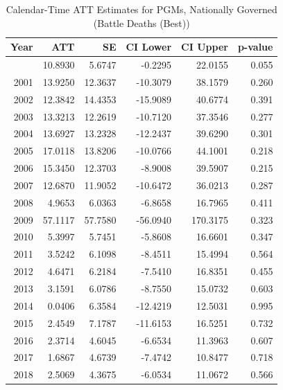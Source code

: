 \begin{longtable}{rrrrrr}
\caption{Calendar-Time ATT Estimates for PGMs, Nationally Governed (Battle Deaths (Best))} \label{tab:cal_pgms} \\
\toprule
\textbf{Year} & \textbf{ATT} & \textbf{SE} & \textbf{CI Lower} & \textbf{CI Upper} & \textbf{p-value} \\
\midrule
\endfirsthead
\bottomrule
\endlastfoot
2000 & 10.8930 & 5.6747 & -0.2295 & 22.0155 & 0.055 \\
2001 & 13.9250 & 12.3637 & -10.3079 & 38.1579 & 0.260 \\
2002 & 12.3842 & 14.4353 & -15.9089 & 40.6774 & 0.391 \\
2003 & 13.3213 & 12.2619 & -10.7120 & 37.3546 & 0.277 \\
2004 & 13.6927 & 13.2328 & -12.2437 & 39.6290 & 0.301 \\
2005 & 17.0118 & 13.8206 & -10.0766 & 44.1001 & 0.218 \\
2006 & 15.3450 & 12.3703 & -8.9008 & 39.5907 & 0.215 \\
2007 & 12.6870 & 11.9052 & -10.6472 & 36.0213 & 0.287 \\
2008 & 4.9653 & 6.0363 & -6.8658 & 16.7965 & 0.411 \\
2009 & 57.1117 & 57.7580 & -56.0940 & 170.3175 & 0.323 \\
2010 & 5.3997 & 5.7451 & -5.8608 & 16.6601 & 0.347 \\
2011 & 3.5242 & 6.1098 & -8.4511 & 15.4994 & 0.564 \\
2012 & 4.6471 & 6.2184 & -7.5410 & 16.8351 & 0.455 \\
2013 & 3.1591 & 6.0786 & -8.7550 & 15.0732 & 0.603 \\
2014 & 0.0406 & 6.3584 & -12.4219 & 12.5031 & 0.995 \\
2015 & 2.4549 & 7.1787 & -11.6153 & 16.5251 & 0.732 \\
2016 & 2.3714 & 4.6045 & -6.6534 & 11.3963 & 0.607 \\
2017 & 1.6867 & 4.6739 & -7.4742 & 10.8477 & 0.718 \\
2018 & 2.5069 & 4.3675 & -6.0534 & 11.0672 & 0.566 \\
\end{longtable}
